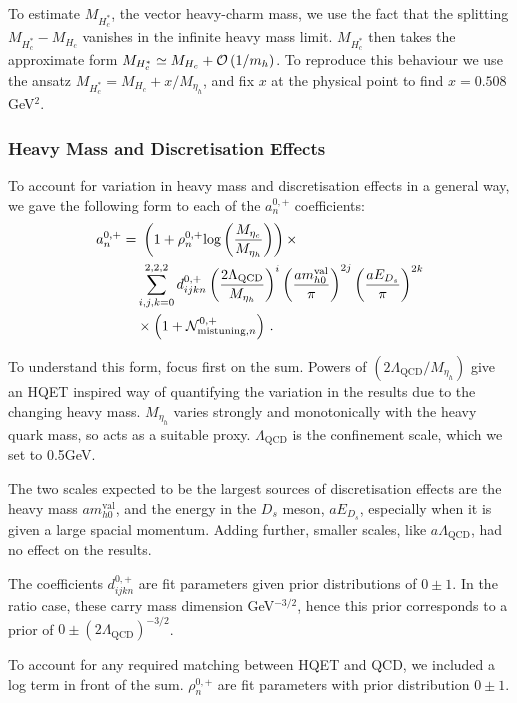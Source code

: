 To estimate $M_{H^*_c}$, the vector heavy-charm mass, we use the fact that the splitting $ M_{H_c^*} - M_{H_c}$ vanishes in the infinite heavy mass limit. $M_{H_c^*}$ then takes the approximate form $M_{H_c^*} \simeq M_{H_c} + \mathcal{O}\left( 1/m_h \right)$. To reproduce this behaviour we use the ansatz $M_{H_c^*} = M_{H_c} + x/M_{\eta_h}$, and fix $x$ at the physical point to find $x=0.508$GeV$^2$.

\subsubsection{Heavy Mass and Discretisation Effects}

To account for variation in heavy mass and discretisation effects in a general way, we gave the following form to each of the $a_n^{0,+}$ coefficients:
\begin{align}
  \nonumber  a_n^{0,+} = & \,\,\left( 1 + \rho^{0,+}_n \text{log}\left(M_{\eta_c}\over M_{\eta_h}\right)\right) \times \\ \nonumber
  &\sum_{i,j,k = 0}^{2,2,2} d^{0,+}_{ijkn} \left({2\Lambda_{\text{QCD}}\over M_{\eta_h} }\right)^{i} \left({ am^{\text{val}}_{h0} \over \pi }\right)^{2j} \left({ aE_{D_s} \over \pi }\right)^{2k} \\ &\times\left(1 + \mathcal{N}_{\text{mistuning},n}^{0,+} \right)\,.
      \label{eq:mhfitfun}
\end{align}

To understand this form, focus first on the sum. Powers of $(2\Lambda_{\text{QCD}}/M_{\eta_h})$ give an HQET inspired way of quantifying the variation in the results due to the changing heavy mass. $M_{\eta_h}$ varies strongly and monotonically with the heavy quark mass, so acts as a suitable proxy. $\Lambda_{\text{QCD}}$ is the confinement scale, which we set to 0.5GeV.

The two scales expected to be the largest sources of discretisation effects are the heavy mass $am_{h0}^{\text{val}}$, and the energy in the $D_s$ meson, $aE_{D_s}$, especially when it is given a large spacial momentum. Adding further, smaller scales, like $a\Lambda_{\text{QCD}}$, had no effect on the results.

The coefficients $d^{0,+}_{ijkn}$ are fit parameters given prior distributions of $0\pm 1$. In the ratio case, these carry mass dimension GeV$^{-3/2}$, hence this prior corresponds to a prior of $0\pm (2\Lambda_{\text{QCD}})^{-3/2}$.

To account for any required matching between HQET and QCD, we included a log term in front of the sum. $\rho^{0,+}_n$ are fit parameters with prior distribution $0\pm 1$.

